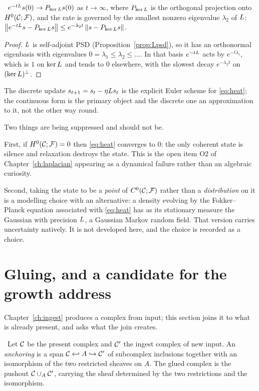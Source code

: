 \begin{proposition}\label{prop:heatconv}
\Proved\ $e^{-tL}s(0)\to P_{\ker L}s(0)$ as $t\to\infty$, where
$P_{\ker L}$ is the orthogonal projection onto $H^{0}(\mathcal{C};\mathcal{F})$, and the rate is
governed by the smallest nonzero eigenvalue $\lambda_2$ of $L$:
$\left\lVert e^{-tL}s-P_{\ker L}s \right\rVert\le e^{-\lambda_2 t}\left\lVert s-P_{\ker L}s \right\rVert$.
\end{proposition}
\begin{proof}
$L$ is self-adjoint PSD (Proposition~\ref{prop:Lpsd}), so it has an
orthonormal eigenbasis with eigenvalues $0=\lambda_1\le\lambda_2\le\dots$.
In that basis $e^{-tL}$ acts by $e^{-t\lambda_i}$, which is $1$ on
$\ker L$ and tends to $0$ elsewhere, with the slowest decay $e^{-\lambda_2t}$
on $(\ker L)^\perp$.
\end{proof}

The discrete update $s_{t+1}=s_t-\eta L s_t$ is the explicit Euler scheme
for \eqref{eq:heat}; the continuous form is the primary object and the
discrete one an approximation to it, not the other way round.

\begin{hon}\Hon
Two things are being suppressed and should not be.

First, if $H^{0}(\mathcal{C};\mathcal{F})=0$ then \eqref{eq:heat} converges to $0$: the only coherent
state is silence and relaxation destroys the state. This is the open item
O2 of Chapter~\ref{ch:laplacian} appearing as a dynamical failure rather than
an algebraic curiosity.

Second, taking the state to be a \emph{point} of $C^{0}(\mathcal{C};\mathcal{F})$ rather than a
\emph{distribution} on it is a modelling choice with an alternative: a density
evolving by the Fokker--Planck equation associated with \eqref{eq:heat} has as
its stationary measure the Gaussian with precision $L$, a Gaussian Markov
random field. That version carries uncertainty natively. It is not developed
here, and the choice is recorded as a choice.
\end{hon}

\section{Gluing, and a candidate for the growth address}\label{sec:mv}

Chapter~\ref{ch:ingest} produces a complex from input; this section joins it
to what is already present, and asks what the join creates.

\begin{construction}\label{con:glue}
\Proposed\ Let $\mathcal{C}$ be the present complex and $\mathcal{C}'$ the ingest complex of
new input. An \emph{anchoring} is a span $\mathcal{C}\hookleftarrow A\hookrightarrow\mathcal{C}'$
of subcomplex inclusions together with an isomorphism of the two restricted
sheaves on $A$. The glued complex is the pushout $\mathcal{C}\cup_A\mathcal{C}'$, carrying the
sheaf determined by the two restrictions and the isomorphism.
\end{construction}

